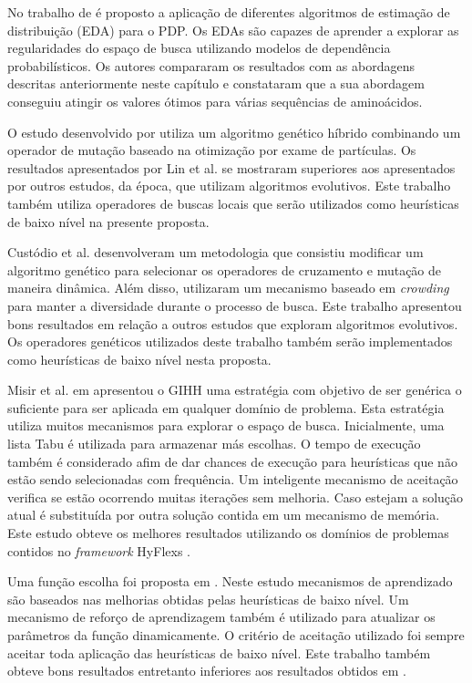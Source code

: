 No trabalho de \cite{santana2008protein} é proposto a aplicação de diferentes algoritmos de estimação de distribuição (EDA) para o PDP. Os EDAs são capazes de aprender a explorar as regularidades do espaço de busca utilizando modelos de dependência probabilísticos. Os autores compararam os resultados com as abordagens descritas anteriormente neste capítulo e constataram que a sua abordagem conseguiu atingir os valores ótimos para várias sequências de aminoácidos.

O estudo desenvolvido por \cite{lin2011protein} utiliza um algoritmo genético híbrido combinando um operador de mutação baseado na otimização por exame de partículas. Os resultados apresentados por Lin et al. se mostraram superiores aos apresentados por outros estudos, da época, que utilizam algoritmos evolutivos. Este trabalho também utiliza operadores de buscas locais que serão utilizados como heurísticas de baixo nível na presente proposta. 


Custódio et al. \cite{custodio2014multiple} desenvolveram um metodologia que consistiu modificar um algoritmo genético para selecionar os operadores de cruzamento e mutação de maneira dinâmica. Além disso, utilizaram um mecanismo baseado em \textit{crowding}  para manter a diversidade durante o processo de busca. Este trabalho apresentou bons resultados em relação a outros estudos que exploram algoritmos evolutivos. Os operadores genéticos utilizados deste trabalho também serão implementados como heurísticas de baixo nível nesta proposta. 


Misir et al. em \cite{misir2012intelligent} apresentou o GIHH uma estratégia com objetivo de ser genérica o suficiente para ser aplicada em qualquer domínio de problema. Esta estratégia utiliza muitos mecanismos para explorar o espaço de busca. Inicialmente, uma lista Tabu é utilizada para armazenar más escolhas. O tempo de execução também é considerado afim de dar chances de execução para heurísticas que não estão sendo selecionadas com frequência. Um inteligente mecanismo de aceitação verifica se estão ocorrendo muitas iterações sem melhoria. Caso estejam a solução atual é substituída por outra solução contida em um mecanismo de memória. Este estudo obteve os melhores resultados utilizando os domínios de problemas contidos no \textit{framework} HyFlexs \cite{ochoa2012hyflex}.

Uma função escolha foi proposta em \cite{drake2012improved}. Neste estudo mecanismos de aprendizado são baseados nas melhorias obtidas pelas heurísticas de baixo nível. Um mecanismo de reforço de aprendizagem também é utilizado para atualizar os parâmetros da função dinamicamente. O critério de aceitação utilizado foi sempre aceitar toda aplicação das heurísticas de baixo nível. Este trabalho também obteve bons resultados entretanto inferiores aos resultados obtidos em \cite{misir2012intelligent}.




